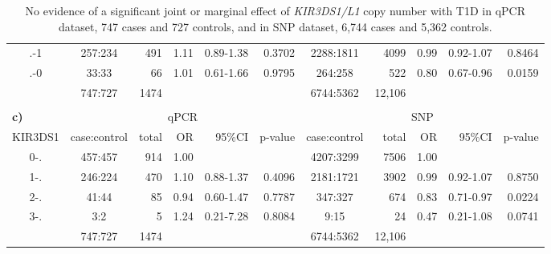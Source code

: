 \begin{table}[h]
\begin{tabularx}{\textwidth}{ccrrrr|crrrr}
    .-1 & 257:234 &  491 & 1.11 & 0.89-1.38 & 0.3702 & 2288:1811 &  4099  & 0.99 & 0.92-1.07 & 0.8464 \\
    .-0 & 33:33 &   66 & 1.01 & 0.61-1.66 & 0.9795 & 264:258 &   522  & 0.80 & 0.67-0.96 & 0.0159 \\
  \hline
    & 747:727 & 1474 &  &  &  & 6744:5362 & 12,106  &  & &  \\
  \\
  \multicolumn{1}{l}{\bf{c)}} & \multicolumn{5}{c}{qPCR} & \multicolumn{5}{c}{SNP} \\
  \hline
    KIR3DS1 & case:control & total & OR & 95\%CI & p-value & case:control & total  & OR & 95\%CI & p-value \\
  \hline
    0-. & 457:457 &  914 & 1.00 &  &  & 4207:3299 &  7506  & 1.00 &  &  \\
    1-. & 246:224 &  470 & 1.10 & 0.88-1.37 & 0.4096 & 2181:1721 &  3902  & 0.99 & 0.92-1.07 & 0.8750 \\
    2-. & 41:44 &   85 & 0.94 & 0.60-1.47 & 0.7787 & 347:327 &   674  & 0.83 & 0.71-0.97 & 0.0224 \\
    3-. & 3:2 &    5  & 1.24 & 0.21-7.28 & 0.8084 & 9:15 &    24  & 0.47 & 0.21-1.08 & 0.0741 \\
  \hline
    & 747:727 & 1474 &  &  &  & 6744:5362 & 12,106  &  & &  \\
\end{tabularx}
    \caption{
        \label{table:kir-t1d}
        No evidence of a significant joint or marginal effect of \emph{KIR3DS1/L1} copy number with T1D in qPCR dataset, 747 cases and 727 controls, and in SNP dataset, 6,744 cases and 5,362 controls.
    }
\end{table}




